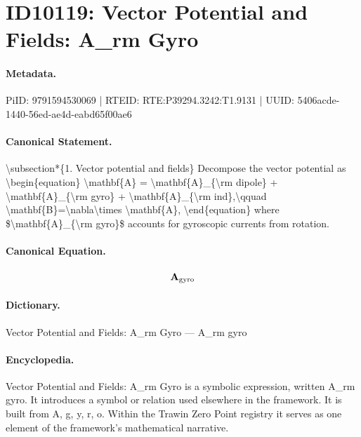 \section*{ID10119: Vector Potential and Fields: A\_rm Gyro}
\paragraph{Metadata.}
PiID: 9791594530069 | RTEID: RTE:P39294.3242:T1.9131 | UUID: 5406acde-1440-56ed-ae4d-eabd65f00ae6

\paragraph{Canonical Statement.}
\textbackslash{}subsection*\{1. Vector potential and fields\} Decompose the vector potential as \textbackslash{}begin\{equation\} \textbackslash{}mathbf\{A\} = \textbackslash{}mathbf\{A\}\_\{\textbackslash{}rm dipole\} + \textbackslash{}mathbf\{A\}\_\{\textbackslash{}rm gyro\} + \textbackslash{}mathbf\{A\}\_\{\textbackslash{}rm ind\},\textbackslash{}qquad \textbackslash{}mathbf\{B\}=\textbackslash{}nabla\textbackslash{}times \textbackslash{}mathbf\{A\}, \textbackslash{}end\{equation\} where \$\textbackslash{}mathbf\{A\}\_\{\textbackslash{}rm gyro\}\$ accounts for gyroscopic currents from rotation.

\paragraph{Canonical Equation.}
\[
\mathbf{A}_{\rm gyro}
\]

\paragraph{Dictionary.}
Vector Potential and Fields: A\_rm Gyro — A\_rm gyro

\paragraph{Encyclopedia.}
Vector Potential and Fields: A\_rm Gyro is a symbolic expression, written A\_rm gyro. It introduces a symbol or relation used elsewhere in the framework. It is built from A, g, y, r, o. Within the Trawin Zero Point registry it serves as one element of the framework's mathematical narrative.
